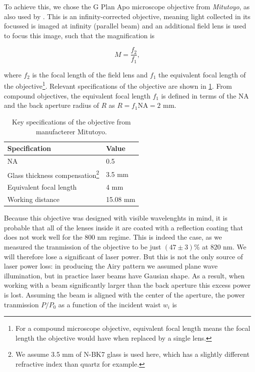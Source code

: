 To achieve this, we chose the G Plan Apo microscope objective from \textit{Mitutoyo}, as also used by \cite{Manuel2016,Ebadi2021}. 
This is an infinity-corrected objective, meaning light collected in its focussed is imaged at infinity (parallel beam) and an additional field lens is used to focus this image, such that the magnification is 

\begin{equation}\label{eq:InfinityMagnification}
    M = \frac{f_2}{f_1},
\end{equation}

where $f_2$ is the focal length of the field lens and $f_1$ the equivalent focal length of the objective\footnote{For a compound microscope objective, equivalent focal length means the focal length the objective would have when replaced by a single lens.}.
Relevant specifications of the objective are shown in \cref{table:MitutoyoSpecs}. 
From compound objectives, the equivalent focal length $f_1$ is defined in terms of the \ac{NA} and the back aperture radius of $R$ as $R = f_1 \text{NA} = 2$ mm. 

\begin{table}[h]
    \centering
    \caption{Key specifications of the objective from manufacterer Mitutoyo.}
    \label{table:MitutoyoSpecs}
    \begin{tabular}{l | l}
        \textbf{Specification}       & \textbf{Value} \\ \hline 
        NA                           & 0.5            \\ \hline
        Glass thickness compensation\footnote{We assume 3.5 mm of N-BK7 glass is used here, which has a slightly different refractive index than quartz for example.} & 3.5 mm         \\ \hline
        Equivalent focal length      & 4 mm           \\ \hline
        Working distance             & 15.08 mm      
    \end{tabular}
\end{table}

Because this objective was designed with visible wavelenghts in mind, it is probable that all of the lenses inside it are coated with a reflection coating that does not work well for the 800 nm regime. 
This is indeed the case, as we measured the tranmission of the objective to be just $(47 \pm 3)\%$ at 820 nm. We will therefore lose a significant of laser power. 
But this is not the only source of laser power loss: in producing the Airy pattern we assumed plane wave illumination, but in practice laser beams have Gausian shape. 
As a result, when working with a beam significantly larger than the back aperture this excess power is lost. 
Assuming the beam is aligned with the center of the aperture, the power tranmission $P/P_0$ as a function of the incident waist $w_i$ is

